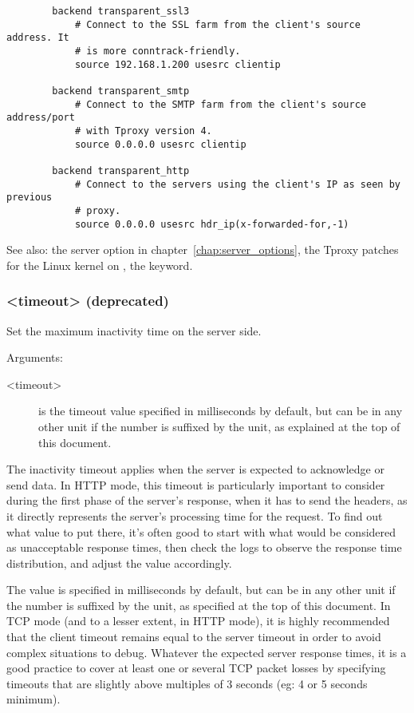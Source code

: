 {\begin{verbatim}
        backend transparent_ssl3
            # Connect to the SSL farm from the client's source address. It
            # is more conntrack-friendly.
            source 192.168.1.200 usesrc clientip

        backend transparent_smtp
            # Connect to the SMTP farm from the client's source address/port
            # with Tproxy version 4.
            source 0.0.0.0 usesrc clientip

        backend transparent_http
            # Connect to the servers using the client's IP as seen by previous
            # proxy.
            source 0.0.0.0 usesrc hdr_ip(x-forwarded-for,-1)
  \end{verbatim}

  See also: the  server option in chapter~\ref{chap:server_options}, the Tproxy patches for
             the Linux kernel on , the  keyword.

\subsubsection[srvtimeout]{ <timeout> (deprecated)}

  Set the maximum inactivity time on the server side.


  Arguments:
  \begin{description}
  \item[<timeout>] is the timeout value specified in milliseconds by default, but
              can be in any other unit if the number is suffixed by the unit,
              as explained at the top of this document.
  \end{description}

  The inactivity timeout applies when the server is expected to acknowledge or
  send data. In HTTP mode, this timeout is particularly important to consider
  during the first phase of the server's response, when it has to send the
  headers, as it directly represents the server's processing time for the
  request. To find out what value to put there, it's often good to start with
  what would be considered as unacceptable response times, then check the logs
  to observe the response time distribution, and adjust the value accordingly.

  The value is specified in milliseconds by default, but can be in any other
  unit if the number is suffixed by the unit, as specified at the top of this
  document. In TCP mode (and to a lesser extent, in HTTP mode), it is highly
  recommended that the client timeout remains equal to the server timeout in
  order to avoid complex situations to debug. Whatever the expected server
  response times, it is a good practice to cover at least one or several TCP
  packet losses by specifying timeouts that are slightly above multiples of 3
  seconds (eg: 4 or 5 seconds minimum).

}
